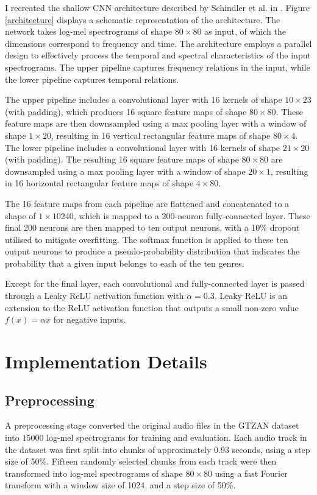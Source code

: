 \documentclass[conference]{IEEEtran}
\begin{document}
I recreated the shallow CNN architecture described by Schindler et al. in \cite{SchindlerLidyRauber}.
Figure \ref{architecture} displays a schematic representation of the architecture.
The network takes log-mel spectrograms of shape $80\times80$ as input, of which the dimensions correspond to frequency and time.
The architecture employs a parallel design to effectively process the temporal and spectral characteristics of the input spectrograms.
The upper pipeline captures frequency relations in the input, while the lower pipeline captures temporal relations.

The upper pipeline includes a convolutional layer with 16 kernels of shape $10\times23$ (with padding), which produces 16 square feature maps of shape $80\times80$.
These feature maps are then downsampled using a max pooling layer with a window of shape $1\times20$, resulting in 16 vertical rectangular feature maps of shape $80\times4$.
The lower pipeline includes a convolutional layer with 16 kernels of shape $21\times20$ (with padding).
The resulting 16 square feature maps of shape $80\times80$ are downsampled using a max pooling layer with a window of shape $20\times1$, resulting in 16 horizontal rectangular feature maps of shape $4\times80$.

The 16 feature maps from each pipeline are flattened and concatenated to a shape of $1\times10240$, which is mapped to a 200-neuron fully-connected layer.
These final 200 neurons are then mapped to ten output neurons, with a 10\% dropout utilised to mitigate overfitting.
The softmax function is applied to these ten output neurons to produce a pseudo-probability distribution that indicates the probability that a given input belongs to each of the ten genres.

Except for the final layer, each convolutional and fully-connected layer is passed through a Leaky ReLU activation function with $\alpha=0.3$.
Leaky ReLU is an extension to the ReLU activation function that outputs a small non-zero value $f(x) = \alpha x$ for negative inputs.

\section{Implementation Details}

\subsection{Preprocessing}

A preprocessing stage converted the original audio files in the GTZAN dataset into 15000 log-mel spectrograms for training and evaluation. 
Each audio track in the dataset was first split into chunks of approximately 0.93 seconds, using a step size of 50\%.
Fifteen randomly selected chunks from each track were then transformed into log-mel spectrograms of shape $80\times80$ using a fast Fourier transform with a window size of 1024, and a step size of 50\%.
\end{document}
